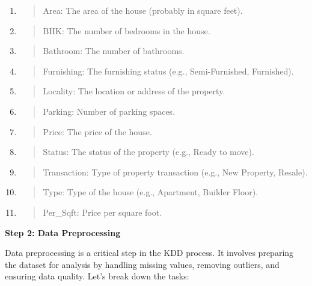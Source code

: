 \documentclass[]{article}
\newcommand{\textcenter}[1]{\begin{center} \vspace{10px}\textbf{\large #1} \end{center}}
\begin{document}
\begin{enumerate}
\def\labelenumi{\arabic{enumi}.}
\item
  \begin{quote}
  Area: The area of the house (probably in square feet).
  \end{quote}
\item
  \begin{quote}
  BHK: The number of bedrooms in the house.
  \end{quote}
\item
  \begin{quote}
  Bathroom: The number of bathrooms.
  \end{quote}
\item
  \begin{quote}
  Furnishing: The furnishing status (e.g., Semi-Furnished, Furnished).
  \end{quote}
\item
  \begin{quote}
  Locality: The location or address of the property.
  \end{quote}
\item
  \begin{quote}
  Parking: Number of parking spaces.
  \end{quote}
\item
  \begin{quote}
  Price: The price of the house.
  \end{quote}
\item
  \begin{quote}
  Status: The status of the property (e.g., Ready to move).
  \end{quote}
\item
  \begin{quote}
  Transaction: Type of property transaction (e.g., New Property,
  Resale).
  \end{quote}
\item
  \begin{quote}
  Type: Type of the house (e.g., Apartment, Builder Floor).
  \end{quote}
\item
  \begin{quote}
  Per\_Sqft: Price per square foot.
  \end{quote}
\end{enumerate}

\textcenter{Step 2: Data Preprocessing}

Data preprocessing is a critical step in the KDD process. It involves
preparing the dataset for analysis by handling missing values, removing
outliers, and ensuring data quality. Let's break down the tasks:
\end{document}
